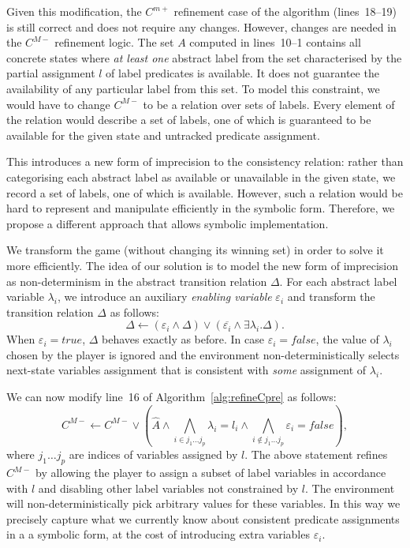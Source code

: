 

Given this modification, the $C^{m+}$ refinement case of the 
algorithm (lines~18--19) is still correct and does not require any 
changes.  However, changes are needed in the $C^{M-}$ refinement 
logic.  The set $A$ computed in lines~10--1 contains all
concrete states where \emph{at least one} abstract label from the 
set characterised by the partial assignment $l$ of label 
predicates is available.  It does not guarantee the availability 
of any particular label from this set.  To model this constraint, we would have 
to change $C^{M-}$ to be a relation over sets of labels.  Every 
element of the relation would describe a set of labels, one of 
which is guaranteed to be available for the given state and 
untracked predicate assignment.  

This introduces a new form of imprecision to the consistency 
relation: rather than categorising each abstract label as 
available or unavailable in the given state, we record a set of 
labels, one of which is available.  However, such a relation would 
be hard to represent and manipulate efficiently in the symbolic 
form.  Therefore, we propose a different approach that allows 
symbolic implementation.  

We transform the game (without changing its winning set) in order 
to solve it more efficiently.  The idea of our solution is to 
model the new form of imprecision as non-determinism in the 
abstract transition relation $\Delta$.  For each abstract label 
variable $\lambda_i$, we introduce an auxiliary \emph{enabling 
variable} $\varepsilon_i$ and transform the transition relation 
$\Delta$ as follows:
$$\Delta \gets (\varepsilon_i \land \Delta) \lor (\overline{\varepsilon_i} \land \exists \lambda_i. \Delta).$$
When $\varepsilon_i=true$, $\Delta$ behaves exactly as before.  In 
case $\varepsilon_i=false$, the value of $\lambda_i$ chosen by the 
player is ignored and the environment non-deterministically 
selects next-state variables assignment that is consistent with 
\emph{some} assignment of $\lambda_i$. 

We can now modify line~16 of Algorithm~\ref{alg:refineCpre} as 
follows:
$$
C^{M-} \gets C^{M-} \lor (\hat{A}\land \bigwedge_{i\in{j_1\ldots j_p}}\lambda_i=l_i \land \bigwedge_{i\not\in{j_1\ldots j_p}}\varepsilon_i=false),
$$
where $j_1\ldots j_p$ are indices of variables assigned by $l$.  
The above statement refines $C^{M-}$ by allowing the player to 
assign a subset of label variables in accordance with $l$ and
disabling other label variables not constrained by $l$.  The 
environment will non-deterministically pick arbitrary values for 
these variables.  In this way we precisely capture what we 
currently know about consistent predicate assignments in a
a symbolic form, at the cost of introducing extra variables 
$\varepsilon_i$.
